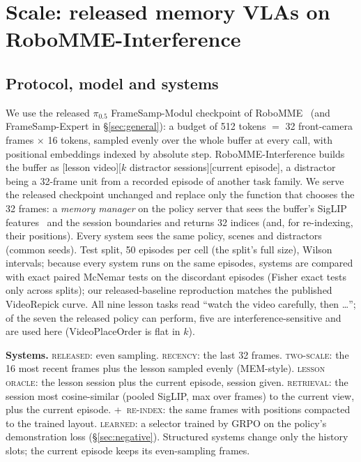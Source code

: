 \documentclass{article}
\newcommand{\sys}[1]{\textsc{#1}}
\begin{document}
\section{Scale: released memory VLAs on RoboMME-Interference}
\label{sec:scale}

\subsection{Protocol, model and systems}
\label{sec:protocol}

We use the released $\pi_{0.5}$ FrameSamp-Modul checkpoint of RoboMME~\cite{robomme} (and FrameSamp-Expert in \S\ref{sec:general}): a budget of 512 tokens $=$ 32 front-camera frames $\times$ 16 tokens, sampled evenly over the whole buffer at every call, with positional embeddings indexed by absolute step. RoboMME-Interference builds the buffer as [lesson video][$k$ distractor sessions][current episode], a distractor being a 32-frame unit from a recorded episode of another task family. We serve the released checkpoint unchanged and replace only the function that chooses the 32 frames: a \emph{memory manager} on the policy server that sees the buffer's SigLIP features~\cite{siglip} and the session boundaries and returns 32 indices (and, for re-indexing, their positions). Every system sees the same policy, scenes and distractors (common seeds). Test split, 50 episodes per cell (the split's full size), Wilson intervals; because every system runs on the same episodes, systems are compared with exact paired McNemar tests on the discordant episodes (Fisher exact tests only across splits); our released-baseline reproduction matches the published VideoRepick curve. All nine lesson tasks read ``watch the video carefully, then \ldots''; of the seven the released policy can perform, five are interference-sensitive and are used here (VideoPlaceOrder is flat in $k$).

\textbf{Systems.} \sys{released}: even sampling. \sys{recency}: the last 32 frames. \sys{two-scale}: the 16 most recent frames plus the lesson sampled evenly (MEM-style). \sys{lesson oracle}: the lesson session plus the current episode, session given. \sys{retrieval}: the session most cosine-similar (pooled SigLIP, max over frames) to the current view, plus the current episode. \sys{+~re-index}: the same frames with positions compacted to the trained layout. \sys{learned}: a selector trained by GRPO on the policy's demonstration loss (\S\ref{sec:negative}). Structured systems change only the history slots; the current episode keeps its even-sampling frames.
\end{document}
